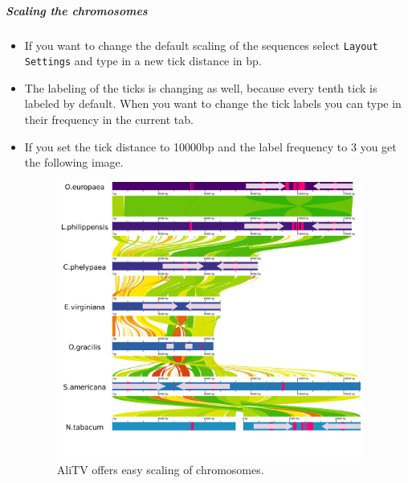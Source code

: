 \documentclass[a4paper]{scrartcl}
\begin{document}
\subparagraph*{Scaling the chromosomes}
\begin{itemize}
	\item If you want to change the default scaling of the sequences select \texttt{Layout Settings} and type in a new tick distance in bp. 
	\item The labeling of the ticks is changing as well, because every tenth tick is labeled by default. When you want to change the tick labels you can type in their frequency in the current tab.
	\item If you set the tick distance to 10000bp and the label frequency to 3 you get the following image.
	\begin{figure}[H]
		\centering
		\includegraphics[width=10cm]{newLabels.png}
		\caption{AliTV offers easy scaling of chromosomes.}
	\end{figure}
\end{itemize}
\end{document}
